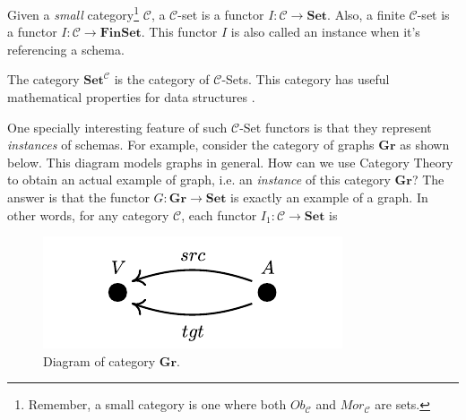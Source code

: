 \begin{definition}
  Given a \textit{small} category\footnote{Remember, a small category is one where both
  $Ob_\mathcal C$ and $Mor_\mathcal C$ are sets.} $\mathcal C$, a $\mathcal C$-set
  is a functor $I:\mathcal C \to \mathbf{Set}$. Also, a finite $\mathcal C$-set
  is a functor $I:\mathcal C \to \mathbf{FinSet}$.
  This functor $I$ is also called an instance when it's referencing a schema.
\end{definition}

The category $\mathbf{Set}^{\mathcal C}$ is the category of $\mathcal C$-Sets. This category
has useful mathematical properties for data structures \citep{patterson2021categorical}.

One specially interesting feature of such $\mathcal C$-Set functors is that they
represent \textit{instances} of schemas. For example, consider the category
of graphs $\mathbf{Gr}$ as shown below. This diagram models graphs in general.
How can we use Category Theory to obtain an actual example of graph, i.e.
an \textit{instance} of this category $\mathbf{Gr}$? The answer is that
the functor $G:\mathbf{Gr}\to\mathbf{Set}$ is exactly an example of a graph.
In other words, for any category $\mathcal C$, each functor
$I_1:\mathcal C \to \mathbf{Set}$ is 

\begin{figure}[H]
  \begin{center}
    \includegraphics{./notebooks/Graph}
  \end{center}
  \caption{Diagram of category $\mathbf{Gr}$.}
  \label{fig:1Cat}
\end{figure}

